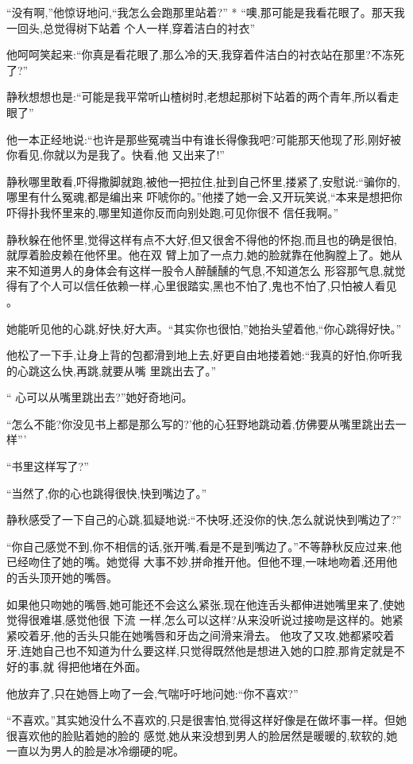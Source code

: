 ﻿\documentclass[12pt]{article}
\begin{document}
``没有啊,''他惊讶地问,``我怎么会跑那里站着?'' * ``噢,那可能是我看花眼了。那天我一回头,总觉得树下站着
个人一样,穿着洁白的衬衣\myrule ''

他呵呵笑起来:``你真是看花眼了,那么冷的天,我穿着件洁白的衬衣站在那里?不冻死了?''

静秋想想也是:``可能是我平常听山楂树时,老想起那树下站着的两个青年,所以看走眼了\myrule ''

他一本正经地说:``也许是那些冤魂当中有谁长得像我吧?可能那天他现了形,刚好被你看见,你就以为是我了。快看,他
又出来了!''

静秋哪里敢看,吓得撒脚就跑,被他一把拉住,扯到自己怀里,搂紧了,安慰说:``骗你的,哪里有什么冤魂,都是编出来
吓唬你的。''他搂了她一会,又开玩笑说,``本来是想把你吓得扑我怀里来的,哪里知道你反而向别处跑,可见你很不
信任我啊。''

静秋躲在他怀里,觉得这样有点不大好,但又很舍不得他的怀抱,而且也的确是很怕,就厚着脸皮赖在他怀里。他在双
臂上加了一点力,她的脸就靠在他胸膛上了。她从来不知道男人的身体会有这样一股令人醉醺醺的气息,不知道怎么
形容那气息,就觉得有了个人可以信任依赖一样,心里很踏实,黑也不怕了,鬼也不怕了,只怕被人看见 。

她能听见他的心跳,好快,好大声。``其实你也很怕,''她抬头望着他,``你心跳得好快。''

他松了一下手,让身上背的包都滑到地上去,好更自由地搂着她:``我真的好怕,你听我的心跳这么快,再跳,就要从嘴
里跳出去了。''

`` 心可以从嘴里跳出去?''她好奇地问。

``怎么不能?你没见书上都是那么写的?'他的心狂野地跳动着,仿佛要从嘴里跳出去一样\myrule '''

``书里这样写了?''

``当然了,你的心也跳得很快,快到嘴边了。''

静秋感受了一下自己的心跳,狐疑地说:``不快呀,还没你的快,怎么就说快到嘴边了?''

``你自己感觉不到,你不相信的话,张开嘴,看是不是到嘴边了。''不等静秋反应过来,他已经吻住了她的嘴。她觉得
大事不妙,拼命推开他。但他不理,一味地吻着,还用他的舌头顶开她的嘴唇。

如果他只吻她的嘴唇,她可能还不会这么紧张,现在他连舌头都伸进她嘴里来了,使她觉得很难堪,感觉他很\myrule 
下流 一样,怎么可以这样?从来没听说过接吻是这样的。她紧紧咬着牙,他的舌头只能在她嘴唇和牙齿之间滑来滑去。
他攻了又攻,她都紧咬着牙,连她自己也不知道为什么要这样,只觉得既然他是想进入她的口腔,那肯定就是不好的事,就
得把他堵在外面。

他放弃了,只在她唇上吻了一会,气喘吁吁地问她:``你\myrule 不喜欢?''

``不喜欢。''其实她没什么不喜欢的,只是很害怕,觉得这样好像是在做坏事一样。但她很喜欢他的脸贴着她的脸的
感觉,她从来没想到男人的脸居然是暖暖的,软软的,她一直以为男人的脸是冰冷绷硬的呢。
\end{document}
